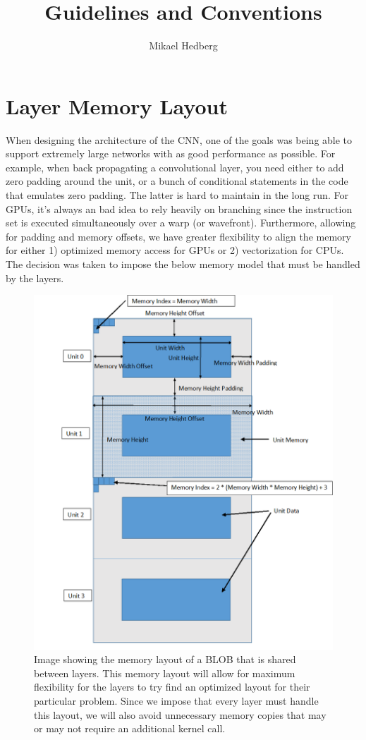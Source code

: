 \documentclass[a4paper,10pt]{article}
\title{Guidelines and Conventions}
\author{Mikael Hedberg}
\begin{document}
	
\maketitle

\section{Layer Memory Layout}
When designing the architecture of the CNN, one of the goals was being able to support extremely large networks with as good performance as possible. For example, when back propagating a convolutional layer, you need either to add zero padding around the unit, or a bunch of conditional statements in the code that emulates zero padding. The latter is hard to maintain in the long run. For GPUs, it's always an bad idea to rely heavily on branching since the instruction set is executed simultaneously over a warp (or wavefront). Furthermore, allowing for padding and memory offsets, we have greater flexibility to align the memory for either 1) optimized memory access for GPUs or 2) vectorization for CPUs. The decision was taken to impose the below memory model that must be handled by the layers.

\begin{figure}[H]
	\centering
	\includegraphics[scale=0.6]{MemoryLayoutWithDescription}
	\caption{Image showing the memory layout of a BLOB that is shared between layers. This memory layout will allow for maximum flexibility for the layers to try find an optimized layout for their particular problem. Since we impose that every layer must handle this layout, we will also avoid unnecessary memory copies that may or may not require an additional kernel call.}
	\label{fig:convNet}
\end{figure}
\end{document}
